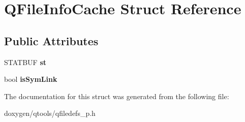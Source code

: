\hypertarget{struct_q_file_info_cache}{}\section{Q\+File\+Info\+Cache Struct Reference}
\label{struct_q_file_info_cache}
\subsection*{Public Attributes}
\begin{DoxyCompactItemize}
\item 
\mbox{\label{struct_q_file_info_cache_a3afe0efbdb42e24dcbacd5742cc607bd}} 
S\+T\+A\+T\+B\+UF {\bfseries st}
\item 
\mbox{\label{struct_q_file_info_cache_ab879a63d2c3f07aaffafabdd3731539a}} 
bool {\bfseries is\+Sym\+Link}
\end{DoxyCompactItemize}


The documentation for this struct was generated from the following file\+:\begin{DoxyCompactItemize}
\item 
doxygen/qtools/qfiledefs\+\_\+p.\+h\end{DoxyCompactItemize}
